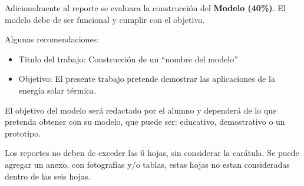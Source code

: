 \documentclass[spanish, letterpaper,12]{article}
\begin{document}
Adicionalmente al reporte se evaluara la construcción del \textbf{Modelo (40\%)}. El modelo debe de ser funcional y cumplir con el objetivo.

Algunas recomendaciones:
\begin{itemize}
\item Titulo del trabajo: Construcción de un ``nombre del modelo''
\item Objetivo: El presente trabajo pretende demostrar las aplicaciones de la energía solar térmica.
\end{itemize}

El objetivo del modelo será redactado por el alumno y dependerá de lo que pretenda obtener con su modelo, que puede ser: educativo, demostrativo o un prototipo.

Los reportes no deben de exceder las 6 hojas, sin considerar la carátula. Se puede agregar un anexo, con fotografías y/o tablas, estas hojas no estan consideradas dentro de las seis hojas.
\end{document}
